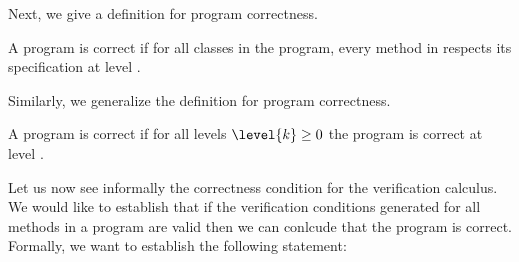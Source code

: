 Next, we give a definition for program correctness. 

\begin{defCorrect}\label{defCorrectProgramLevel}
A program is correct if for all classes \class{} in the program, every method \methodd{} in \class{}
respects its specification at level .
\end{defCorrect}



Similarly, we generalize the definition for program correctness. 

\begin{defCorrect}\label{defCorrectProgram}
A program is correct
if for all levels $\level{k} \ge 0 $ the program is correct at level .
\end{defCorrect}



Let us now see informally the correctness condition for the verification calculus. 
We would like to establish that if the verification conditions
generated for all methods in a program are valid then we can conlcude that the program is correct. 
Formally, we want to establish the following statement:

